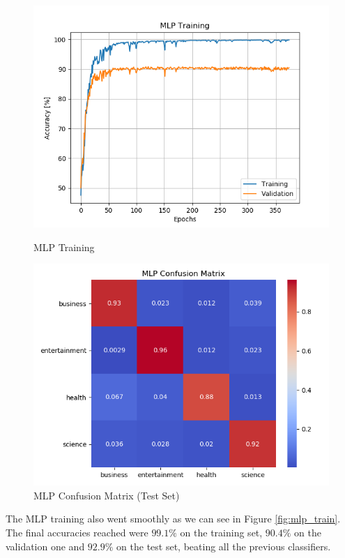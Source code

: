 \documentclass[10pt,a4paper]{report}
\begin{document}
\begin{figure}
    \centering
    \begin{minipage}{0.45\textwidth}
        \centering
        \includegraphics[width=\textwidth]{mlp_training.png} %
        \caption{MLP Training}
        \label{fig:mlp_train}
    \end{minipage}\hfill
    \begin{minipage}{0.45\textwidth}
        \centering
        \includegraphics[width=\textwidth]{mlp_confmat.png} %
        \caption{MLP Confusion Matrix (Test Set)}
        \label{fig:mlp_confmat}
    \end{minipage}
\end{figure}
The MLP training also went smoothly as we can see in Figure \ref{fig:mlp_train}. The final accuracies reached were $99.1 \%$ on the training set, $90.4 \%$ on the validation one and $92.9 \%$ on the test set, beating all the previous classifiers.
\end{document}
